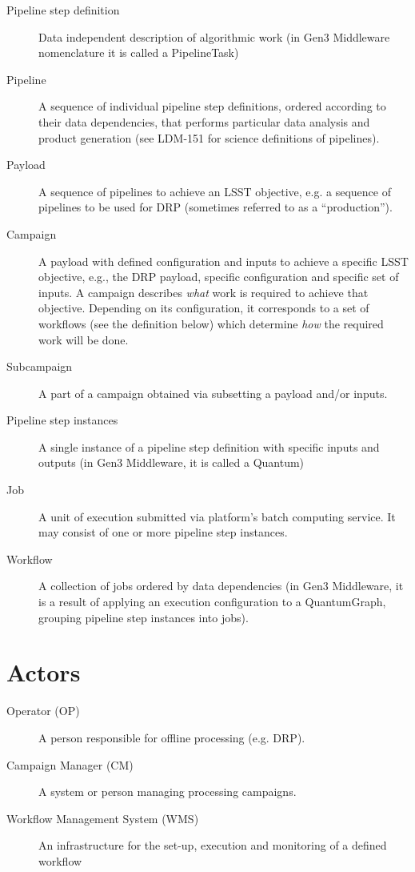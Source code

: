 \documentclass[DM,lsstdraft,toc]{lsstdoc}
\begin{document}
\begin{description}
  \item[Pipeline step definition]
    Data independent description of algorithmic work (in Gen3 Middleware
    nomenclature it is called a PipelineTask)
  \item[Pipeline] 
    A sequence of individual pipeline step definitions, ordered according to
    their data dependencies, that performs particular data analysis and product
    generation (see LDM-151 for science definitions of pipelines).
  \item[Payload]
    A sequence of pipelines to achieve an LSST objective, e.g. a sequence of
    pipelines to be used for DRP (sometimes referred to as a ``production'').
  \item[Campaign]
    A payload with defined configuration and inputs to achieve a
    specific LSST objective, e.g., the DRP payload, specific
    configuration and specific set of inputs. A campaign describes
    \emph{what} work is required to achieve that objective.  Depending on
    its configuration, it corresponds to a set of workflows (see the
    definition below) which determine \emph{how} the required work will be
    done.
  \item[Subcampaign]
    A part of a campaign obtained via subsetting a payload and/or inputs.
  \item[Pipeline step instances]
    A single instance of a pipeline step definition with specific inputs and
    outputs (in Gen3 Middleware, it is called a Quantum)
  \item[Job]
    A unit of execution submitted via platform's batch computing
    service. It may consist of one or more pipeline step instances.
  \item[Workflow]
    A collection of jobs ordered by data dependencies (in Gen3 Middleware, it
    is a result of applying an execution configuration to a QuantumGraph,
    grouping pipeline step instances into jobs).
\end{description}

\section{Actors}

\begin{description}
  \item[Operator (OP)]
    A person responsible for offline processing (e.g. DRP). 
  \item[Campaign Manager (CM)]
    A system or person managing processing campaigns.
  \item[Workflow Management System (WMS)]
    An infrastructure for the set-up, execution and monitoring of a defined
    workflow
\end{description}
\end{document}
